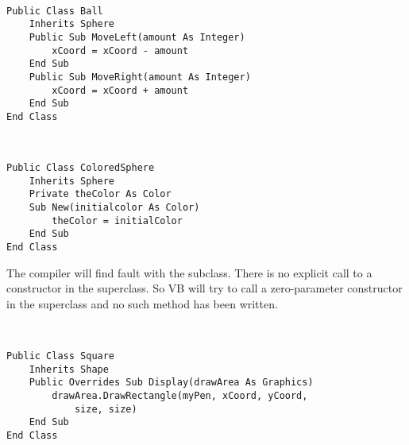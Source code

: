 		\begin{stab}
			\begin{enumChapter}
				\item	\
					\begin{lstlisting}
Public Class Ball
	Inherits Sphere
	Public Sub MoveLeft(amount As Integer)
		xCoord = xCoord - amount
	End Sub	
	Public Sub MoveRight(amount As Integer)
		xCoord = xCoord + amount
	End Sub
End Class
					\end{lstlisting}
				\item \
					\begin{lstlisting}
Public Class ColoredSphere
	Inherits Sphere
	Private theColor As Color
	Sub New(initialcolor As Color)
		theColor = initialColor
	End Sub
End Class
					\end{lstlisting}
				\item	The compiler will find fault with the subclass. There is no explicit call to a constructor in the superclass. So VB will try to call a zero-parameter constructor in the superclass and no such method has been written.
				\item \
					\begin{lstlisting}
Public Class Square
	Inherits Shape
	Public Overrides Sub Display(drawArea As Graphics)
		drawArea.DrawRectangle(myPen, xCoord, yCoord,
			size, size)
	End Sub
End Class
					\end{lstlisting}
			\end{enumChapter}
		\end{stab}

